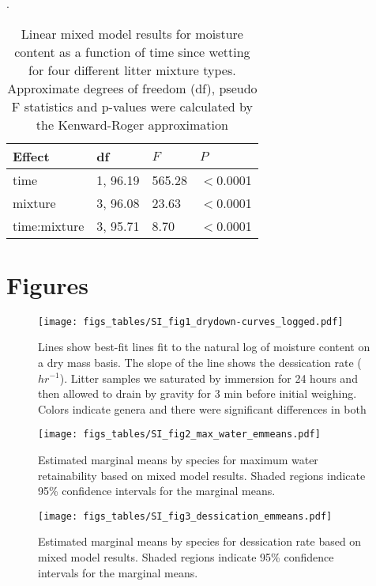 \documentclass[letterpaper]{article}
\begin{document}
\begin{table}[H]
  \caption{Linear mixed model results for moisture content as a function of
    time since wetting for four different litter mixture types. Approximate
    degrees of freedom (df), pseudo F statistics and p-values were calculated
    by the Kenward-Roger approximation}.
  \label{tab:mixtures_drydown}
\centering

\begin{tabular}{llll}
  \toprule
Effect & df & $F$ & $P$ \\ 
  \midrule
time & 1, 96.19 & 565.28 & $<$0.0001 \\ 
  mixture & 3, 96.08 & 23.63 & $<$0.0001 \\ 
  time:mixture & 3, 95.71 & 8.70 & $<$0.0001 \\ 
   \bottomrule
\end{tabular}
\end{table}

\section{Figures}

\begin{figure}[H]
  \centering
  \texttt{[image: figs\_tables/SI\_fig1\_drydown-curves\_logged.pdf]}
   \label{SI_fig1}
\caption[Semi-log scale dry down curves for eight litter types.]{Lines show best-fit lines fit to the natural log of moisture content on a dry mass basis.  The slope of the line shows the dessication rate ($hr^{-1}$). Litter samples we saturated by immersion for 24 hours and then allowed to drain by gravity for 3 min before initial weighing. Colors indicate genera and there were significant differences in both }

\end{figure}



\begin{figure}[H]
  \centering
  \label{SI_fig2}
  \texttt{[image: figs\_tables/SI\_fig2\_max\_water\_emmeans.pdf]}
\caption{Estimated marginal means by species for maximum water retainability based on mixed model results. Shaded regions indicate 95\% confidence intervals for the marginal means.}
\end{figure}


\begin{figure}[H]
  \centering
  \label{SI_fig3}
\texttt{[image: figs\_tables/SI\_fig3\_dessication\_emmeans.pdf]}
\caption{Estimated marginal means by species for dessication rate based on mixed model results. Shaded regions indicate 95\% confidence intervals for the marginal means.}
\end{figure}
\end{document}
